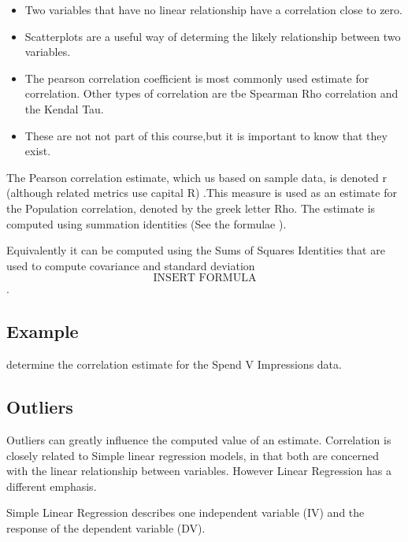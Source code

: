 \documentclass[]{report}
\begin{document}
\begin{itemize}
	\item  Two variables that have no linear relationship have a correlation close to zero. 
	
	\item Scatterplots are a useful way of determing the likely relationship between two variables. 
	
	\item The pearson correlation coefficient is most commonly used estimate for correlation. Other types of correlation are tbe Spearman Rho correlation and the Kendal Tau. 
	
	\item  These are not not part of this course,but it is important to know that they exist. 
\end{itemize}




The Pearson correlation estimate, which us based on sample data, is denoted r (although related metrics use capital R) .This measure is used as an estimate for the Population correlation, denoted by the greek letter Rho. 
The estimate is computed using summation identities (See the formulae ). 

Equivalently it can be computed using the  Sums of Squares Identities that are used to compute covariance and standard deviation \[\mbox{INSERT FORMULA}\] .

\subsection{Example}
determine the correlation estimate for the Spend V Impressions data.  




\subsection{Outliers}
Outliers can greatly influence the computed value of an estimate.
Correlation is closely related to Simple linear regression models, in that both are concerned with the linear relationship between variables. However Linear Regression has a different emphasis.

Simple Linear Regression describes one independent variable (IV) and the response of the dependent variable (DV). 
\end{document}

